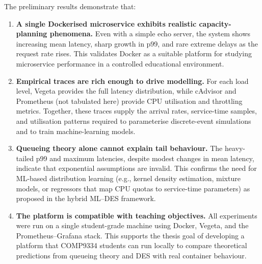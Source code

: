 The preliminary results demonstrate that:

\begin{enumerate}
    \item \textbf{A single Dockerised microservice exhibits realistic
    capacity-planning phenomena.} Even with a simple echo server, the
    system shows increasing mean latency, sharp growth in p99, and rare
    extreme delays as the request rate rises. This validates Docker as a
    suitable platform for studying microservice performance in a
    controlled educational environment.

    \item \textbf{Empirical traces are rich enough to drive modelling.}
    For each load level, Vegeta provides the full latency distribution,
    while cAdvisor and Prometheus (not tabulated here) provide CPU
    utilisation and throttling metrics. Together, these traces supply
    the arrival rates, service-time samples, and utilisation patterns
    required to parameterise discrete-event simulations and to train
    machine-learning models.

    \item \textbf{Queueing theory alone cannot explain tail behaviour.}
    The heavy-tailed p99 and maximum latencies, despite modest changes
    in mean latency, indicate that exponential assumptions are invalid.
    This confirms the need for ML-based distribution learning (e.g.,
    kernel density estimation, mixture models, or regressors that map
    CPU quotas to service-time parameters) as proposed in the hybrid
    ML--DES framework.

    \item \textbf{The platform is compatible with teaching objectives.}
    All experiments were run on a single student-grade machine using
    Docker, Vegeta, and the Prometheus--Grafana stack. This supports the
    thesis goal of developing a platform that COMP9334 students can run
    locally to compare theoretical predictions from queueing theory and
    DES with real container behaviour.
\end{enumerate}

